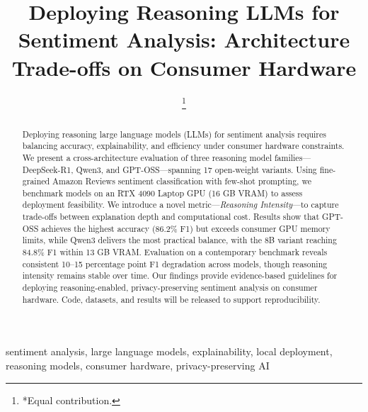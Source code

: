 \documentclass[conference]{IEEEtran}
\begin{document}
\title{Deploying Reasoning LLMs for Sentiment Analysis: Architecture Trade-offs on Consumer Hardware}

\author{
\thanks{*Equal contribution.}
}

\maketitle

\begin{abstract}
Deploying reasoning large language models (LLMs) for sentiment analysis requires balancing accuracy, explainability, and efficiency under consumer hardware constraints. We present a cross-architecture evaluation of three reasoning model families—DeepSeek-R1, Qwen3, and GPT-OSS—spanning 17 open-weight variants. Using fine-grained Amazon Reviews sentiment classification with few-shot prompting, we benchmark models on an RTX 4090 Laptop GPU (16 GB VRAM) to assess deployment feasibility. We introduce a novel metric---\textit{Reasoning Intensity}---to capture trade-offs between explanation depth and computational cost. Results show that GPT-OSS achieves the highest accuracy (86.2\% F1) but exceeds consumer GPU memory limits, while Qwen3 delivers the most practical balance, with the 8B variant reaching 84.8\% F1 within 13 GB VRAM. Evaluation on a contemporary benchmark reveals consistent 10--15 percentage point F1 degradation across models, though reasoning intensity remains stable over time. Our findings provide evidence-based guidelines for deploying reasoning-enabled, privacy-preserving sentiment analysis on consumer hardware. Code, datasets, and results will be released to support reproducibility.
\end{abstract}

\begin{IEEEkeywords}
sentiment analysis, large language models, explainability, local deployment, reasoning models, consumer hardware, privacy-preserving AI
\end{IEEEkeywords}
\end{document}
